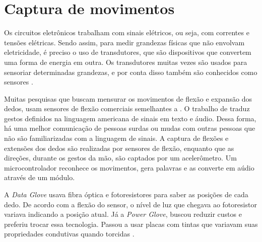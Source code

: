 \documentclass[
	12pt,				%
	openright,			%
	oneside,			%
	a4paper,			%
	english,			%
	brazil				%
	]{abntex2}
\begin{document}
		
		\section{Captura de movimentos}



		Os circuitos eletrônicos trabalham com sinais elétricos, ou seja, com correntes e tensões elétricas. Sendo assim, para medir grandezas físicas que não envolvam eletricidade, é preciso o uso de transdutores, que são dispositivos que convertem uma forma de energia em outra. Os transdutores muitas vezes são usados para sensoriar determinadas grandezas, e por conta disso também são conhecidos como sensores \cite{ncb2012eletronicabasica}.

		Muitas pesquisas que buscam mensurar os movimentos de flexão e expansão dos dedos, usam sensores de flexão comerciais semelhantes a \cite{flexsensor}. O trabalho de \cite{anbarasi2013deafmute} traduz gestos definidos na linguagem americana de sinais em texto e áudio. Dessa forma, há uma melhor comunicação de pessoas surdas ou mudas com outras pessoas que não são familiarizadas com a linguagem de sinais. A captura de flexões e extensões dos dedos são realizadas por sensores de flexão, enquanto que as direções, durante os gestos da mão, são captados por um acelerômetro. Um microcontrolador reconhece os movimentos, gera palavras e as converte em aúdio através de um módulo. 

		A \textit{Data Glove} usava fibra óptica e fotoresistores para saber as posições de cada dedo. De acordo com a flexão do sensor, o nível de luz que chegava ao fotoresistor variava indicando a posição atual. Já a \textit{Power Glove}, buscou reduzir custos e preferiu trocar essa tecnologia. Passou a usar placas com tintas que variavam suas propriedades condutivas quando torcidas \cite{dana1989powerglove}.

\end{document}
